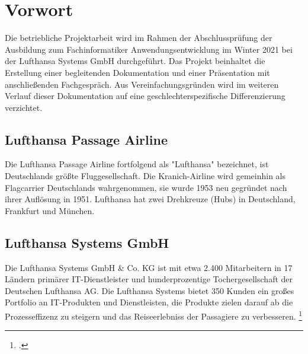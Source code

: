 \section{Vorwort}

	Die betriebliche Projektarbeit wird im Rahmen der Abschlussprüfung der Ausbildung zum
	Fachinformatiker Anwendungsentwicklung im Winter 2021 bei der Lufthansa Systems GmbH durchgeführt.
	Das Projekt beinhaltet die Erstellung einer begleitenden
	Dokumentation und einer Präsentation mit anschließenden Fachgespräch. Aus Vereinfachungsgründen wird im weiteren Verlauf dieser Dokumentation auf eine geschlechterspezifische
	Differenzierung verzichtet.


	\subsection{Lufthansa Passage Airline}
	Die Lufthansa Passage Airline fortfolgend als "Lufthansa" bezeichnet, ist Deutschlands größte Fluggesellschaft. Die Kranich-Airline wird gemeinhin als Flagcarrier Deutschlands wahrgenommen, sie wurde 1953 neu gegründet nach ihrer Auflösung in 1951. Lufthansa hat zwei Drehkreuze (Hubs) in Deutschland, Frankfurt und München.

	\subsection{Lufthansa Systems GmbH}
	Die Lufthansa Systems GmbH \& Co. KG ist mit etwa 2.400 Mitarbeitern in 17 Ländern primärer IT-Dienstleister und hunderprozentige Tochergesellschaft der Deutschen Lufthansa AG.
	Die Lufthansa Systems bietet 350 Kunden ein großes Portfolio an IT-Produkten und Dienstleisten, die Produkte zielen darauf ab die Prozesseffizenz zu steigern und das Reiseerlebniss der Passagiere zu verbesseren.
	\footcite{1}

